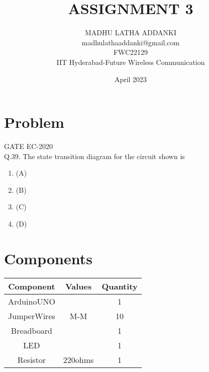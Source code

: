 \documentclass{article}
\title{ASSIGNMENT 3}
\date{April 2023}
\author{MADHU LATHA ADDANKI\\madhulathaaddanki@gmail.com\\FWC22129\\IIT Hyderabad-Future Wireless Communication }
\begin{document}
\maketitle
 \tableofcontents

\pagebreak
\section{Problem}
 {GATE EC-2020}\\
 Q.39. The state transition diagram for the circuit shown is
\begin{figure}[h]
	 \centering
	 
\end{figure}

\begin{enumerate}
\item{(A)}
        \begin{figure}[h]
	        \centering
	        
        \end{figure}
\pagebreak
\item{(B)}
        \begin{figure}[h]
         	\centering
	        
        \end{figure}
\item{(C)}
	\begin{figure}[h]
		\centering
		
	\end{figure}
\item{(D)}
	\begin{figure}[h]
		\centering
		
	\end{figure}
\end{enumerate}
\pagebreak
\section{Components}
 \begin{table}[h]
  \centering
   \begin{tabular}{|c|c|c|}
   \hline
   \textbf{Component}& \textbf{Values} & \textbf{Quantity}\\
\hline
ArduinoUNO &  & 1 \\  
\hline
JumperWires& M-M & 10 \\ 
\hline
Breadboard &  & 1 \\
\hline
LED & &1 \\
\hline
Resistor &220ohms & 1\\
\hline
   \end{tabular}
   \end{table}
\end{document}
